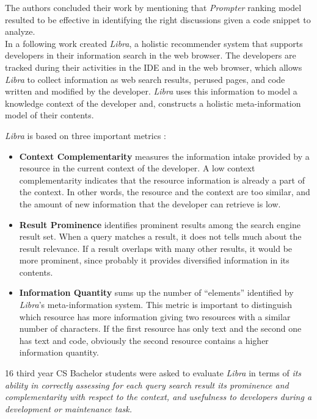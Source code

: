 \documentclass[12pt,mscthesis]{usiinfthesis}
\begin{document}
	The authors concluded their work by mentioning that \emph{Prompter} ranking model resulted to be effective in identifying the right discussions given a code snippet to analyze.\\


	
	In a following work \citet{Ponz2017a} created \emph{Libra}, a holistic recommender system that supports developers in their information search in the web browser. The developers are tracked during their activities in the IDE and in the web browser, which allows \emph{Libra} to collect information as web search results, perused pages, and code written and modified by the developer. \emph{Libra} uses this information to model a knowledge context of the developer and, constructs a holistic meta-information model of their contents.
	

	\emph{Libra} is based on three important metrics :
	
	\begin{itemize}
	\item \textbf{Context Complementarity} measures the information intake provided by a resource in the current context of the developer. A low context complementarity indicates that the resource information is already a part of the context. In other words, the resource and the context are too similar, and the amount of new information that the developer can retrieve is low.
	
	\item \textbf{Result Prominence} identifies prominent results among the search engine result set. When a query matches a result, it does not tells much about the result relevance. If a result overlaps with many other results, it would be more prominent, since probably it provides diversified information in its contents.
	
	\item \textbf{Information Quantity} sums up the number of ``elements'' identified by \emph{Libra}'s meta-information system. This metric is important to distinguish which resource has more information giving two resources with a similar number of characters. If the first resource has only text and the second one has text and code, obviously the second resource contains a higher information quantity.
	\end{itemize}
	16 third year CS Bachelor students were asked to evaluate \emph{Libra} in terms of \textit{its ability in correctly assessing for each query search result its prominence and complementarity with respect to the context, and usefulness to developers during a development or maintenance task.}
\end{document}
